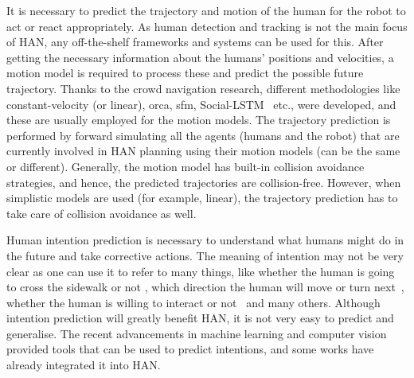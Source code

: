 
It is necessary to predict the trajectory and motion of the human for the robot to act or react appropriately. As human detection and tracking is not the main focus of HAN, any off-the-shelf frameworks and systems can be used for this. After getting the necessary information about the humans' positions and velocities, a motion model is required to process these and predict the possible future trajectory. Thanks to the crowd navigation research, different methodologies like constant-velocity (or linear), \acrshort{orca}, \acrshort{sfm}, Social-LSTM~\cite{alahi2016social} etc., were developed, and these are usually employed for the motion models. The trajectory prediction is performed by forward simulating all the agents (humans and the robot) that are currently involved in HAN planning using their motion models (can be the same or different). Generally, the motion model has built-in collision avoidance strategies, and hence, the predicted trajectories are collision-free. However, when simplistic models are used (for example, linear), the trajectory prediction has to take care of collision avoidance as well.

Human intention prediction is necessary to understand what humans might do in the future and take corrective actions. The meaning of intention may not be very clear as one can use it to refer to many things, like whether the human is going to cross the sidewalk or not \cite{kohler2012early}, which direction the human will move or turn next~\cite{peddi2020data}, whether the human is willing to interact or not~\cite{ratsamee2013social} and many others. Although intention prediction will greatly benefit HAN, it is not very easy to predict and generalise. The recent advancements in machine learning and computer vision provided tools that can be used to predict intentions, and some works \cite{peddi2020data, ratsamee2013social} have already integrated it into HAN.

